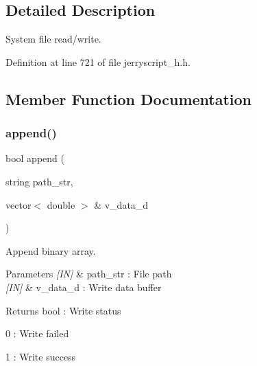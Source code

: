 \subsection{Detailed Description}
System file read/write. 

Definition at line 721 of file jerryscript\+\_\+h.\+h.



\subsection{Member Function Documentation}
\mbox{\label{classfile_a50fc19c821482a9181022aa5b506db46}} 
\subsubsection{append()\hspace{0.1cm}{\footnotesize\ttfamily [1/2]}}
{\footnotesize\ttfamily bool append (\begin{DoxyParamCaption}\item[{string}]{path\+\_\+str,  }\item[{vector$<$ double $>$ \&}]{v\+\_\+data\+\_\+d }\end{DoxyParamCaption})}



Append binary array. 


\begin{DoxyCode}{0}
\end{DoxyCode}



\begin{DoxyParams}{Parameters}
{\em \mbox{[}\+I\+N\mbox{]}} & path\+\_\+str \+: File path \\
\hline
{\em \mbox{[}\+I\+N\mbox{]}} & v\+\_\+data\+\_\+d \+: Write data buffer \\
\hline
\end{DoxyParams}
\begin{DoxyReturn}{Returns}
bool \+: Write status \begin{DoxyItemize}
\item 0 \+: Write failed \item 1 \+: Write success \end{DoxyItemize}

\end{DoxyReturn}
\mbox{\label{classfile_acbc04e63b90204ea300106e633edfff9}} 
